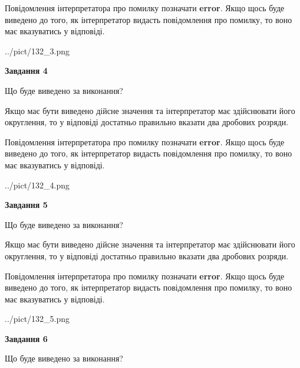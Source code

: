 \documentclass[12pt, ukrainian]{article}
\begin{document}
{\begin {Large}
Повідомлення інтерпретатора про помилку позначати \textbf{error}.
Якщо щось буде виведено до того, як інтерпретатор видасть повідомлення про помилку, 
то воно має вказуватись у відповіді. \par

\begin{center}
	{../pict/132_3.png}
\end{center}
\newpage

{\begin {center}\textbf{Завдання 4}\end {center}}\par
Що буде виведено за виконання? \par

Якщо має бути виведено дійсне значення та інтерпретатор має здійснювати його округлення, 
то у відповіді достатньо правильно вказати два дробових розряди.

Повідомлення інтерпретатора про помилку позначати \textbf{error}.
Якщо щось буде виведено до того, як інтерпретатор видасть повідомлення про помилку, 
то воно має вказуватись у відповіді. \par

\begin{center}
	{../pict/132_4.png}
\end{center}
\newpage

{\begin {center}\textbf{Завдання 5}\end {center}}\par
Що буде виведено за виконання? \par

Якщо має бути виведено дійсне значення та інтерпретатор має здійснювати його округлення, 
то у відповіді достатньо правильно вказати два дробових розряди.

Повідомлення інтерпретатора про помилку позначати \textbf{error}.
Якщо щось буде виведено до того, як інтерпретатор видасть повідомлення про помилку, 
то воно має вказуватись у відповіді. \par

\begin{center}
	{../pict/132_5.png}
\end{center}
\newpage

{\begin {center}\textbf{Завдання 6}\end {center}}\par
Що буде виведено за виконання? \par


\end{Large}}
\end{document}
